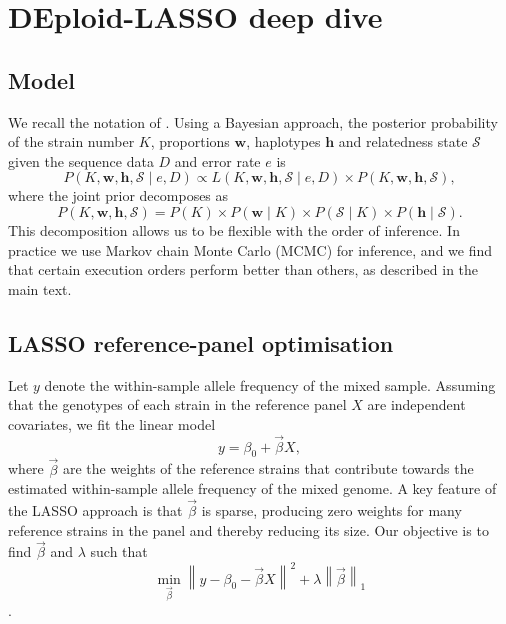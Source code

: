 \documentclass{article}
\renewcommand{\thepage}{S1-\arabic{page}}
\begin{document}
\newpage
\renewcommand{\thepage}{S2--\arabic{page}}

\setcounter{page}{1}


\section{DEploid-LASSO deep dive}
\subsection{Model}
\label{sec:model}
We recall the notation of \citet{Zhu2019}. Using a Bayesian approach, the posterior probability of the strain number $K$, proportions $\mathbf{w}$, haplotypes $\mathbf{h}$ and relatedness state $\mathcal{S}$ given the sequence data $D$ and error rate $e$ is
\begin{equation}
P(K, \mathbf{w}, \mathbf{h}, \mathcal{S} \mid e, D) \propto L(K, \mathbf{w}, \mathbf{h}, \mathcal{S} \mid e, D) \times P(K, \mathbf{w}, \mathbf{h}, \mathcal{S}),
\end{equation}
where the joint prior decomposes as
\begin{equation}
P(K, \mathbf{w}, \mathbf{h}, \mathcal{S}) = P(K) \times P(\mathbf{w} \mid K) \times P(\mathcal{S} \mid K) \times P(\mathbf{h} \mid \mathcal{S}).
\end{equation}
This decomposition allows us to be flexible with the order of inference. In practice we use Markov chain Monte Carlo (MCMC) for inference, and we find that certain execution orders perform better than others, as described in the main text.

\subsection{LASSO reference-panel optimisation}
\label{sec:lasso}
Let $y$ denote the within-sample allele frequency of the mixed sample. Assuming that the genotypes of each strain in the reference panel $X$ are independent covariates, we fit the linear model
\begin{equation}
y = \beta_0 + \overrightarrow{\beta} X,
\end{equation}
where $\overrightarrow{\beta}$ are the weights of the reference strains that contribute towards the estimated within-sample allele frequency of the mixed genome. A key feature of the LASSO approach is that $\overrightarrow{\beta}$ is sparse, producing zero weights for many reference strains in the panel and thereby reducing its size. Our objective is to find $\overrightarrow{\beta}$ and $\lambda$ such that
\begin{equation}
\min_{\overrightarrow{\beta}} \left\| y - \beta_{0} - \overrightarrow{\beta} X \right\|^{2} + \lambda \left\| \overrightarrow{\beta} \right\|_{1}
\end{equation}
\citep{Friedman2010}.
\end{document}
